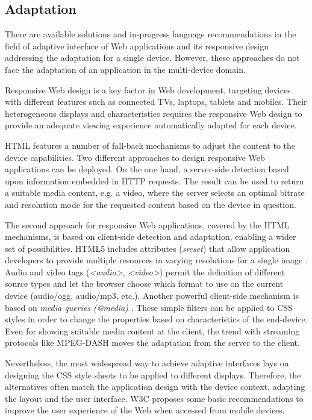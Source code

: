 \subsection{Adaptation}


There are available solutions and in-progress language recommendations in the field of adaptive interface of Web applications and its responsive design addressing the adaptation for a single device. However, these approaches do not face the adaptation of an application in the multi-device domain.

Responsive Web design is a key factor in Web development, targeting devices with different features such as connected TVs, laptops, tablets and mobiles. Their heterogeneous displays and characteristics requires the responsive Web design to provide an adequate viewing experience automatically adapted for each device.

HTML features a number of fall-back mechanisms to adjust the content to the device capabilities. Two different approaches to design responsive Web applications can be deployed. On the one hand, a server-side detection based upon information embedded in HTTP requests. The result can be used to return a suitable media content, e.g. a video, where the server selects an optimal bitrate and resolution mode for the requested content based on the device in question.

The second approach for responsive Web applications, covered by the HTML mechanisms, is based on client-side detection and adaptation, enabling a wider set of possibilities. HTML5 includes attributes (\textit{srcset}) that allow application developers to provide multiple resources in varying resolutions for a single image \cite{W3C2014HTML}. Audio and video tags (\textit{<audio>}, \textit{<video>}) permit the definition of different source types and let the browser choose which format to use on the current device (audio/ogg, audio/mp3, etc.). Another powerful client-side mechanism is based on \textit{media queries (@media)} \cite{W3C2012MQ}. These simple filters can be applied to CSS styles in order to change the properties based on characteristics of the end-device. Even for showing suitable media content at the client, the trend with streaming protocols like MPEG-DASH moves the adaptation from the server to the client.

Nevertheless, the most widespread way to achieve adaptive interfaces lays on designing the CSS style sheets to be applied to different displays. Therefore, the alternatives often match the application design with the device context, adapting the layout and the user interface. W3C proposes some basic recommendations \cite{W3C2010WA} to improve the user experience of the Web when accessed from mobile devices.

